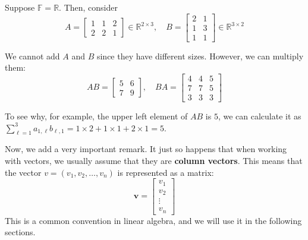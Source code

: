 \documentclass[../lecture-notes.tex]{subfiles}
\begin{document}
\begin{example}
    Suppose $\mathbb{F} = \mathbb{R}$. Then, consider 
    \begin{equation*}
        A = \begin{bmatrix}
            1 & 1 & 2 \\
            2 & 2 & 1
        \end{bmatrix} \in \mathbb{R}^{2 \times 3}, \quad B = \begin{bmatrix}
            2 & 1 \\
            1 & 3 \\
            1 & 1
        \end{bmatrix} \in \mathbb{R}^{3 \times 2}
    \end{equation*}

    We cannot add $A$ and $B$ since they have different sizes. However, we can multiply them:
    \begin{equation*}
        AB = \begin{bmatrix}
            5 & 6 \\ 7 & 9
        \end{bmatrix}, \quad BA = \begin{bmatrix}
            4 & 4 & 5 \\
            7 & 7 & 5 \\
            3 & 3 & 3
        \end{bmatrix}
    \end{equation*}

    To see why, for example, the upper left element of $AB$ is $5$, we can calculate it as $\sum_{\ell=1}^3 a_{1,\ell}b_{\ell,1} = 1 \times 2 + 1 \times 1 + 2 \times 1 = 5$.
\end{example}

\begin{remark}
    Now, we add a very important remark. It just so happens that when working with vectors, we usually assume that they are \textbf{column vectors}. This means that the vector $v = (v_1,v_2,\dots,v_n)$ is represented as a matrix:
    \begin{equation*}
        \mathbf{v} = \begin{bmatrix} v_1 \\ v_2 \\ \vdots \\ v_n \end{bmatrix}
    \end{equation*} 
    This is a common convention in linear algebra, and we will use it in the following sections.
\end{remark}
\end{document}
